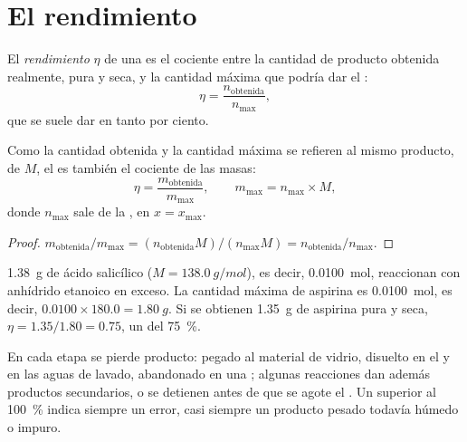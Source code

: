 \section{El rendimiento}

\begin{definition}[Rendimiento]\label{def:g10:synthesis-yield:yield}
El \emph{rendimiento} $\eta$ de una  es el
cociente entre la cantidad de producto obtenida realmente, pura y seca,
y la cantidad máxima que podría dar el :
\[
  \eta = \frac{n_{\text{obtenida}}}{n_{\max}} ,
\]
que se suele dar en tanto por ciento.
\end{definition}

\begin{proposition}\label{prop:g10:synthesis-yield:masses}
Como la cantidad obtenida y la cantidad máxima se refieren al mismo
producto, de  $M$, el  es también el cociente de
las masas:
\[
  \eta = \frac{m_{\text{obtenida}}}{m_{\max}},
  \qquad m_{\max} = n_{\max} \times M,
\]
donde $n_{\max}$ sale de la , en $x = x_{\max}$.
\end{proposition}

\begin{proof}
$m_{\text{obtenida}} / m_{\max} = (n_{\text{obtenida}} M) / (n_{\max} M)
= n_{\text{obtenida}} / n_{\max}$.
\end{proof}

\begin{example}\label{ex:g10:synthesis-yield:small}
\qty{1.38}{g} de ácido salicílico ($M = \qty{138.0}{g/mol}$), es decir,
\qty{0.0100}{mol}, reaccionan con anhídrido etanoico en exceso. La
cantidad máxima de aspirina es \qty{0.0100}{mol}, es decir,
$0.0100 \times 180.0 = \qty{1.80}{g}$. Si se obtienen \qty{1.35}{g} de
aspirina pura y seca, $\eta = 1.35 / 1.80 = 0.75$, un  del
\qty{75}{\percent}.
\end{example}

\begin{remark}\label{rem:g10:synthesis-yield:below}
En cada etapa se pierde producto: pegado al material de vidrio, disuelto
en el  y en las aguas de lavado, abandonado en una
; algunas reacciones dan además productos secundarios,
o se detienen antes de que se agote el . Un
 superior al \qty{100}{\percent} indica siempre un error, casi
siempre un producto pesado todavía húmedo o impuro.
\end{remark}

